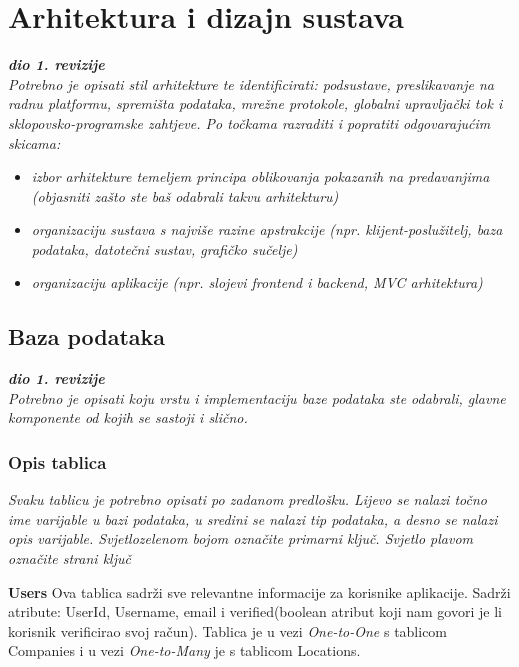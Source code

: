 \chapter{Arhitektura i dizajn sustava}
		\textbf{\textit{dio 1. revizije}}\\

		\textit{ Potrebno je opisati stil arhitekture te identificirati: podsustave, preslikavanje na radnu platformu, spremišta podataka, mrežne protokole, globalni upravljački tok i sklopovsko-programske zahtjeve. Po točkama razraditi i popratiti odgovarajućim skicama:}
	\begin{itemize}
		\item 	\textit{izbor arhitekture temeljem principa oblikovanja pokazanih na predavanjima (objasniti zašto ste baš odabrali takvu arhitekturu)}
		\item 	\textit{organizaciju sustava s najviše razine apstrakcije (npr. klijent-poslužitelj, baza podataka, datotečni sustav, grafičko sučelje)}
		\item 	\textit{organizaciju aplikacije (npr. slojevi frontend i backend, MVC arhitektura) }		
	\end{itemize}

	
		

		

				
		\section{Baza podataka}
			
			\textbf{\textit{dio 1. revizije}}\\
			
		\textit{Potrebno je opisati koju vrstu i implementaciju baze podataka ste odabrali, glavne komponente od kojih se sastoji i slično.}
		
			\subsection{Opis tablica}
			

				\textit{Svaku tablicu je potrebno opisati po zadanom predlošku. Lijevo se nalazi točno ime varijable u bazi podataka, u sredini se nalazi tip podataka, a desno se nalazi opis varijable. Svjetlozelenom bojom označite primarni ključ. Svjetlo plavom označite strani ključ}
				
				
				\textbf{Users}\hspace{1cm}  Ova tablica sadrži sve relevantne informacije za korisnike aplikacije. Sadrži atribute: UserId, Username, email i verified(boolean atribut koji nam govori je li korisnik verificirao svoj račun). Tablica je u vezi \textit{One-to-One} s tablicom Companies i u vezi \textit{One-to-Many} je s tablicom Locations. 

